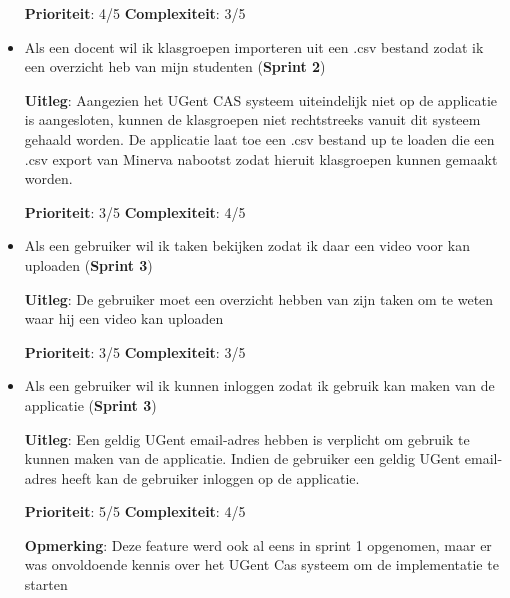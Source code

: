 \begin{itemize}
        \textbf{Prioriteit}: 4/5 \textbf{Complexiteit}: 3/5
 \item Als een docent wil ik klasgroepen importeren uit een .csv bestand zodat ik een overzicht heb van mijn studenten (\textbf{Sprint 2})

        \textbf{Uitleg}: Aangezien het UGent CAS systeem uiteindelijk niet op de applicatie is aangesloten, kunnen de klasgroepen niet rechtstreeks vanuit dit systeem gehaald worden. De applicatie laat toe een .csv bestand up te loaden die een .csv export van Minerva nabootst zodat hieruit klasgroepen kunnen gemaakt worden.

        \textbf{Prioriteit}: 3/5 \textbf{Complexiteit}: 4/5
 \item  Als een gebruiker wil ik taken bekijken zodat ik daar een video voor kan uploaden (\textbf{Sprint 3})
        
        \textbf{Uitleg}: De gebruiker moet een overzicht hebben van zijn taken om te weten waar hij een video kan uploaden
        
        \textbf{Prioriteit}: 3/5 \textbf{Complexiteit}: 3/5
 \item Als een gebruiker wil ik kunnen inloggen zodat ik gebruik kan maken van de applicatie (\textbf{Sprint 3})

        \textbf{Uitleg}: Een geldig UGent email-adres hebben is verplicht om gebruik te kunnen maken van de applicatie. Indien de gebruiker een geldig UGent email-adres heeft kan de gebruiker inloggen op de applicatie.


        \textbf{Prioriteit}: 5/5 \textbf{Complexiteit}: 4/5

        \textbf{Opmerking}: Deze feature werd ook al eens in sprint 1 opgenomen, maar er was onvoldoende kennis over het UGent Cas systeem om de implementatie te starten

        
        
\end{itemize}


